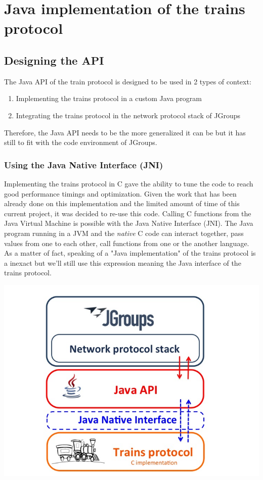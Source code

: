 \documentclass[a4paper,10pt]{report}
\begin{document}
\chapter{Java implementation of the trains protocol}

\section{Designing the API}

The Java API of the train protocol is designed to be used in 2 types of context:
\begin{enumerate}
  \item Implementing the trains protocol in a custom Java program
  \item Integrating the trains protocol in the network protocol stack of JGroups\\
\end{enumerate}

Therefore, the Java API needs to be the more generalized it can be but it has still to fit with the code environment of JGroups.

\subsection{Using the Java Native Interface (JNI)}

Implementing the trains protocol in C gave the ability to tune the code to reach good performance timings and optimization.
Given the work that has been already done on this implementation and the limited amount of time of this current project, 
it was decided to re-use this code. Calling C functions from the Java Virtual Machine is possible with the Java Native Interface (JNI).
The Java program running in a JVM and the \textit{native} C code can interact together, pass values from one to each other, call functions from one or the another
language. As a matter of fact, speaking of a "Java implementation" of the trains protocol is a inexact but we'll still use this expression
meaning the Java interface of the trains protocol.\\

\begin{center}
\includegraphics[scale=0.4]{img/stackJNI.jpg}
\end{center}
\end{document}
